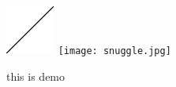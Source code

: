 \documentclass{article}
\begin{document}
	\begin{figure}
		\includegraphics{demo01.pdf}
		\texttt{[image: snuggle.jpg]}
		\caption{this is demo}
	\end{figure}
\end{document}
